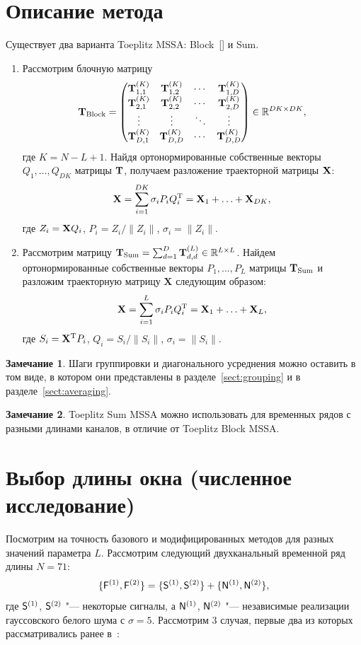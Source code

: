 \documentclass[specialist,
substylefile = spbu_report.rtx,
subf,href,colorlinks=true, 12pt]{disser}
\newcommand{\traj}{\mathbf{X}}
\theoremstyle{definition}
\newtheorem{remark}{Замечание}
\begin{document}
\section{Описание метода}
Существует два варианта Toeplitz MSSA: Block~[] и Sum.
\begin{enumerate}
	\item Рассмотрим блочную матрицу $$\mathbf{T}_{\text{Block}}=\begin{pmatrix}
			      \mathbf{T}^{(K)}_{1,1} & \mathbf{T}^{(K)}_{1,2} & \cdots & \mathbf{T}^{(K)}_{1,D} \\
			      \mathbf{T}^{(K)}_{2,1} & \mathbf{T}^{(K)}_{2,2} & \cdots & \mathbf{T}^{(K)}_{2,D} \\
			      \vdots           & \vdots           & \ddots & \vdots           \\
			      \mathbf{T}^{(K)}_{D,1} & \mathbf{T}^{(K)}_{D,D} & \cdots & \mathbf{T}^{(K)}_{D,D}
		      \end{pmatrix} \in \mathbb{R}^{DK\times DK},$$ где $K = N - L + 1$. Найдя ортонормированные собственные векторы $Q_1,\ldots,Q_{DK}$ матрицы $\mathbf{T}$, получаем разложение траекторной матрицы $\mathbf{X}$:
	      \begin{equation}\label{eq:block_decomposition}
		      \mathbf{X}=\sum_{i=1}^{DK} \sigma_i P_i Q_i^{\mathrm{T}}=\mathbf{X}_1+\ldots+\mathbf{X}_{DK},
	      \end{equation}
	      где $Z_i=\mathbf{X} Q_i$, $P_i=Z_i/\|Z_i\|$, $\sigma_i=\|Z_i\|$.
	\item Рассмотрим матрицу $\mathbf{T}_{\text{Sum}}=\sum_{d=1}^D \mathbf{T}_{d,d}^{(L)}\in\mathbb{R}^{L\times L}$. Найдем ортонормированные собственные векторы $P_1,\ldots,P_L$ матрицы $\mathbf{T}_{\text{Sum}}$ и разложим траекторную матрицу $\traj$ следующим образом:
	      \begin{equation}\label{eq:sum_decomposition}
		      \mathbf{X}=\sum_{i=1}^L\sigma_i P_iQ_i^{\mathrm{T}}=\mathbf{X}_1+\ldots+\mathbf{X}_L,
	      \end{equation}
	      где $S_i=\mathbf{X}^{\mathrm{T}} P_i$, $Q_i=S_i/\|S_i\|$, $\sigma_i=\|S_i\|$.
\end{enumerate}
\begin{remark}
Шаги группировки и диагонального усреднения можно оставить в том виде, в котором они представлены в разделе~\ref{sect:grouping} и в разделе~\ref{sect:averaging}.
\end{remark}
\begin{remark}
Toeplitz Sum MSSA можно использовать для временных рядов с разными длинами каналов, в отличие от Toeplitz Block MSSA.
\end{remark}
\section{Выбор длины окна (численное исследование)}
Посмотрим на точность базового и модифицированных методов для разных значений параметра $L$. Рассмотрим следующий двухканальный временной ряд длины ${N=71}$:
$$\{\mathsf{F}^{(1)}, \mathsf{F}^{(2)}\}=\{\mathsf{S}^{(1)},\mathsf{S}^{(2)}\} + \{\mathsf{N}^{(1)},\mathsf{N}^{(2)}\},$$
где $\mathsf{S}^{(1)}$, $\mathsf{S}^{(2)}$ "--- некоторые сигналы, а $\mathsf{N}^{(1)}$, $\mathsf{N}^{(2)}$ "--- независимые реализации гауссовского белого шума с $\sigma=5$. Рассмотрим 3 случая, первые два из которых рассматривались ранее в~\cite{Golyandina_2015}:
\end{document}
